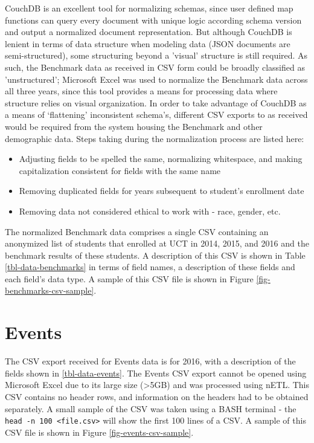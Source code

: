 CouchDB is an excellent tool for normalizing schemas, since user defined map functions can query every document with unique logic according schema version and output a normalized document representation. But although CouchDB is lenient in terms of data structure when modeling data (JSON documents are semi-structured), some structuring beyond a 'visual' structure is still required. As such, the Benchmark data as received in CSV form could be broadly classified as 'unstructured'; Microsoft Excel was used to normalize the Benchmark data across all three years, since this tool provides a means for processing data where structure relies on visual organization. In order to take advantage of CouchDB as a means of `flattening' inconsistent schema's, different CSV exports to as received would be required from the system housing the Benchmark and other demographic data. Steps taking during the normalization process are listed here:

\begin{itemize}
    \item Adjusting fields to be spelled the same, normalizing whitespace, and making capitalization consistent for fields with the same name
    \item Removing duplicated fields for years subsequent to student's enrollment date
    \item Removing data not considered ethical to work with - race, gender, etc.
\end{itemize}

The normalized Benchmark data comprises a single CSV containing an anonymized list of students that enrolled at UCT in 2014, 2015, and 2016 and the benchmark results of these students. A description of this CSV is shown in Table \ref{tbl-data-benchmarks} in terms of field names, a description of these fields and each field's data type. A sample of this CSV file is shown in Figure \ref{fig-benchmarks-csv-sample}.




\section{Events}
The CSV export received for Events data is for 2016, with a description of the fields shown in \ref{tbl-data-events}. The Events CSV export cannot be opened using Microsoft Excel due to its large size (\textgreater 5GB) and was processed using nETL. This CSV contains no header rows, and information on the headers had to be obtained separately. A small sample of the CSV was taken using a BASH terminal - the \texttt{head -n 100 <file.csv>} will show the first 100 lines of a CSV. A sample of this CSV file is shown in Figure \ref{fig-events-csv-sample}.


